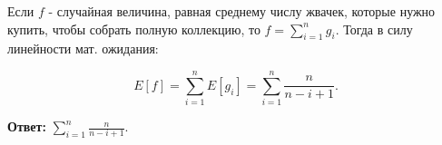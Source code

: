 \documentclass{article}
\begin{document}
    Если $f$ - случайная величина, равная среднему числу жвачек, которые нужно купить, чтобы собрать полную коллекцию, то $f = \sum_{i=1}^{n}g_i$. Тогда в силу линейности мат. ожидания:

    $$ E[f] = \sum_{i=1}^{n} E[g_i] = \sum_{i=1}^{n} \frac{n}{n - i + 1}.$$

    \textbf{Ответ:} $\sum_{i=1}^{n} \frac{n}{n - i + 1}$.
 
\end{document}
